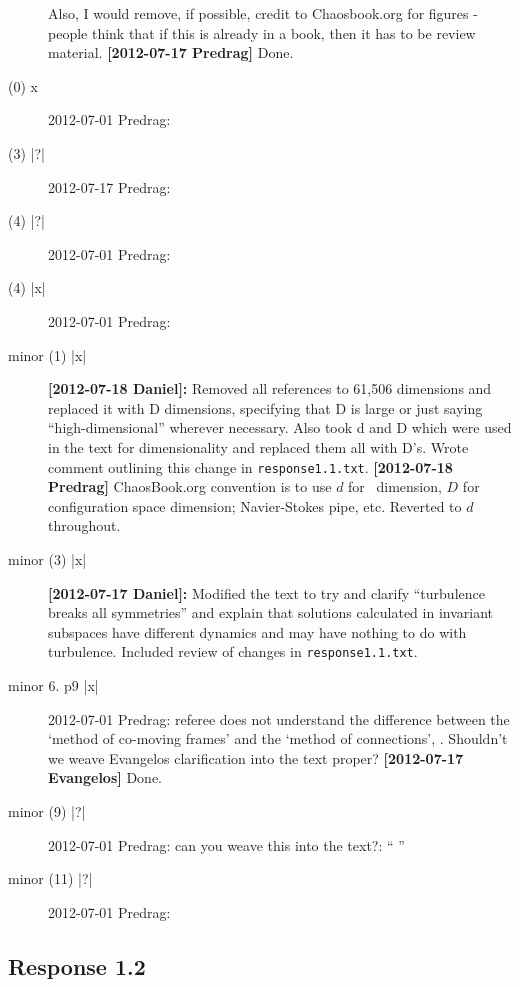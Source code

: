\begin{description}
Also, I would remove, if possible, credit to Chaosbook.org for figures -
people think that if this is already in a book, then it has to be review
material.
 {\bf [2012-07-17 Predrag]} Done.


\item[(0)  x ] 2012-07-01 Predrag:

\item[(3) |?|] 2012-07-17 Predrag:

\item[(4) |?|] 2012-07-01 Predrag:

\item[(4) |x|] 2012-07-01 Predrag:

\item[minor (1) |x|] {\bf [2012-07-18 Daniel]:} Removed all references to
61,506 dimensions and replaced it with D dimensions, specifying that D is
large or just saying ``high-dimensional'' wherever necessary. Also took
d and D which were used in the text for dimensionality and replaced them
all with D's. Wrote comment outlining this change in \texttt{response1.1.txt}.
{\bf [2012-07-18 Predrag]}
ChaosBook.org convention is to use $d$ for \statesp\ dimension, $D$ for
configuration space dimension; Navier-Stokes pipe, etc. Reverted to $d$
throughout.

\item[minor (3) |x|] {\bf [2012-07-17 Daniel]:} Modified the text to try
and clarify ``turbulence breaks all symmetries'' and explain that
solutions calculated in invariant subspaces have different dynamics and
may have nothing to do with turbulence. Included review of changes in
\texttt{response1.1.txt}.

\item[minor 6. p9 |x|] 2012-07-01 Predrag:
 referee does not understand the difference between the `method of
 co-moving frames' and the `method of connections',
 . Shouldn't we weave Evangelos clarification
 into the text proper? {\bf [2012-07-17 Evangelos]} Done.

\item[minor (9) |?|] 2012-07-01 Predrag: can you weave this into the text?: ``
''

\item[minor (11) |?|] 2012-07-01 Predrag:

\end{description}

\subsection{Response 1.2}
\label{sect:Response1.2}

